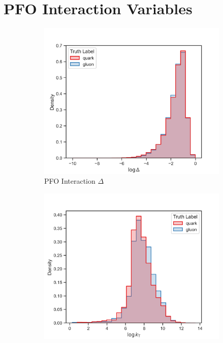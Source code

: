 \FloatBarrier
\newpage

\section{PFO Interaction Variables}
\label{sec:app_pfo_int_variables}

\begin{figure}[!htb]
    \begin{subfigure}[t]{0.45\textwidth}
        \includegraphics[width=\linewidth]{src/plots/distributions/int_PFOs/delta.png}
        \caption{PFO Interaction $\Delta$}
        \label{fig:app_pfo_interaction_delta}
    \end{subfigure}
    \begin{subfigure}[t]{0.45\textwidth}
        \includegraphics[width=\linewidth]{src/plots/distributions/int_PFOs/k_t.png}

\end{subfigure}
\end{figure}
